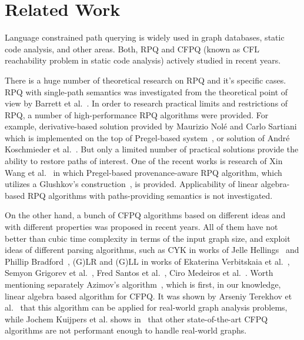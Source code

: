 \section{Related Work}

Language constrained path querying is widely used in graph databases, static code analysis, and other areas.
Both, RPQ and CFPQ (known as CFL reachability problem in static code analysis) actively studied in recent years.

There is a huge number of theoretical research on RPQ and it's specific cases.
RPQ with single-path semantics was investigated from the theoretical point of view by Barrett et al.~\cite{barrett2000formal}.
In order to research practical limits and restrictions of RPQ, a number of high-performance RPQ algorithms were provided.
For example, derivative-based solution provided by Maurizio Nol\'{e} and Carlo Sartiani which is implemented on the top of Pregel-based system~\cite{10.1145/2949689.2949711}, or solution of Andr\'{e} Koschmieder et al.~\cite{10.1007/978-3-642-31235-9_12}.
But only a limited number of practical solutions provide the ability to restore paths of interest. 
One of the recent works is research of Xin Wang et al.~\cite{Wang2019} in which Pregel-based provenance-aware RPQ algorithm, which utilizes a Glushkov's construction~\cite{Glushkov1961}, is provided.
Applicability of linear algebra-based RPQ algorithms with paths-providing semantics is not investigated.

On the other hand, a bunch of CFPQ algorithms based on different ideas and with different properties was proposed in recent years. 
All of them have not better than cubic time complexity in terms of the input graph size, and exploit ideas of different parsing algorithms, such as CYK in works of Jelle Hellings~\cite{hellingsRelational} and Phillip Bradford~\cite{8249039}, (G)LR and (G)LL in works of Ekaterina Verbitskaia et al.~\cite{10.1007/978-3-319-41579-6_22}, Semyon Grigorev et al.~\cite{Grigorev:2017:CPQ:3166094.3166104}, Fred Santos et al.~\cite{10.1007/978-3-319-91662-0_17}, Ciro Medeiros et al.~\cite{Medeiros:2018:EEC:3167132.3167265}.
Worth mentioning separately Azimov's algorithm~\cite{Azimov:2018:CPQ:3210259.3210264}, which is first, in our knowledge, linear algebra based algorithm for CFPQ. 
It was shown by Arseniy Terekhov et al.~\cite{10.1145/3398682.3399163} that this algorithm can be applied for real-world graph analysis problems, while Jochem Kuijpers et al. shows in~\cite{Kuijpers:2019:ESC:3335783.3335791} that other state-of-the-art CFPQ algorithms are not performant enough to handle real-world graphs.

